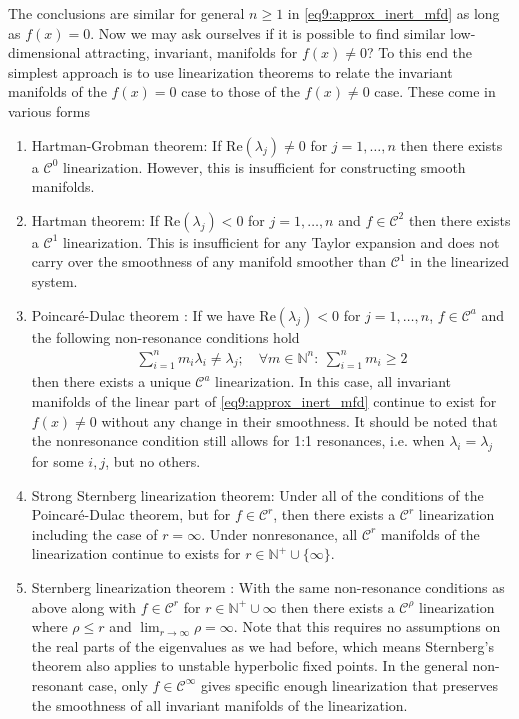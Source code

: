 The conclusions are similar for general $n\geq 1$ in \eqref{eq9:approx_inert_mfd} as long as $f(x) = 0$. Now we may ask ourselves if it is possible to find similar low-dimensional attracting, invariant, manifolds for $f(x) \neq 0$? To this end the simplest approach is to use linearization theorems to relate the invariant manifolds of the $f(x)=0$ case to those of the $f(x) \neq 0$ case. These come in various forms
\begin{enumerate}
	\item Hartman-Grobman theorem: If $ \textrm{Re} (\lambda_j) \neq 0$ for $j=1,\ldots,n$ then there exists a $\mathcal{C}^{0}$ linearization. However, this is insufficient for constructing smooth manifolds.
	\item Hartman theorem: If $ \textrm{Re} (\lambda_j)<0$ for $j=1,\ldots,n$ and $f\in \mathcal{C}^{2}$ then there exists a $\mathcal{C}^{1}$ linearization. This is insufficient for any Taylor expansion and does not carry over the smoothness of any manifold smoother than $\mathcal{C}^{1}$ in the linearized system.
	\item Poincaré-Dulac theorem \cite{poincare1951}: If we have $ \textrm{Re} (\lambda_j)<0$ for $j=1,\ldots,n$, $f\in \mathcal{C}^{a}$ and the following non-resonance conditions hold
		\begin{align}
			\sum_{i=1}^{n} m_i \lambda_i \neq \lambda_j;\quad \forall m\in\mathbb{N}^{n}:\ \sum_{i=1}^{n} m_{i} \geq 2
		\end{align}
		then there exists a unique $\mathcal{C}^{a}$ linearization. In this case, all invariant manifolds of the linear part of \eqref{eq9:approx_inert_mfd} continue to exist for $f(x)\neq 0$ without any change in their smoothness. It should be noted that the nonresonance condition still allows for 1:1 resonances, i.e. when $\lambda_i = \lambda_j$ for some $i,j$, but no others.
	\item Strong Sternberg linearization theorem: Under all of the conditions of the Poincaré-Dulac theorem, but for $f\in \mathcal{C}^{r}$, then there exists a $\mathcal{C}^{r}$ linearization including the case of $r=\infty $. Under nonresonance, all $\mathcal{C}^{r}$ manifolds of the linearization continue to exists for $r \in \mathbb{N}^{+}\cup \{\infty \}$.
	\item Sternberg linearization theorem \cite{Sterberg1957}: With the same non-resonance conditions as above along with $f\in\mathcal{C}^{r}$ for $r \in \mathbb{N}^{+}\cup \infty $ then there exists a $\mathcal{C}^{\rho}$ linearization where $\rho\leq r$ and $\lim_{r\to \infty }\rho = \infty $. Note that this requires no assumptions on the real parts of the eigenvalues as we had before, which means Sternberg's theorem also applies to unstable hyperbolic fixed points. In the general non-resonant case, only $f\in \mathcal{C}^{\infty }$ gives specific enough linearization that preserves the smoothness of all invariant manifolds of the linearization.  
		
\end{enumerate}
